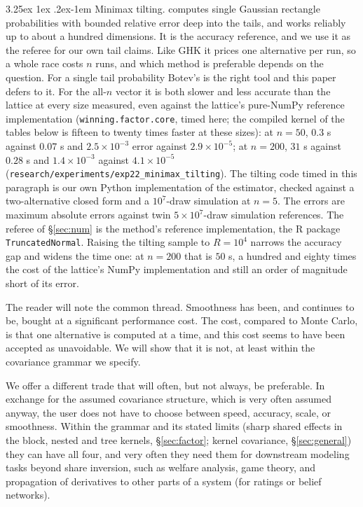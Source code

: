 \documentclass[11pt]{article}
\makeatletter
\renewcommand\paragraph{\@startsection{paragraph}{4}{\z@}%
  {3.25ex \@plus1ex \@minus.2ex}{-1em}%
  {\normalfont\normalsize\itshape}}
\makeatother
\begin{document}
\paragraph{Minimax tilting.} \citet{botev2017} computes single Gaussian
rectangle probabilities with bounded relative error deep into the tails,
and works reliably up to about a hundred dimensions. It is the accuracy reference, and
we use it as the referee for our own tail claims. Like GHK it prices one
alternative per run, so a whole race costs $n$ runs, and which method is
preferable depends on the question. For a single tail probability Botev's
is the right tool and this paper defers to it. For the all-$n$ vector it
is both slower and less accurate than the lattice at every size measured,
even against the lattice's pure-NumPy reference implementation
(\texttt{winning.factor.core}, timed here; the compiled kernel of the
tables below is fifteen to twenty times faster at these sizes):
at $n=50$, $0.3$ s against $0.07$ s and $2.5\times10^{-3}$ error against
$2.9\times10^{-5}$; at $n=200$, $31$ s against $0.28$ s and
$1.4\times10^{-3}$ against $4.1\times10^{-5}$
(\texttt{research/experiments/exp22\_minimax\_tilting}). The tilting
code timed in this paragraph is our own Python implementation of the
estimator, checked against a two-alternative closed form and a
$10^{7}$-draw simulation at $n=5$. The errors are maximum absolute
errors against twin $5\times10^{7}$-draw simulation references. The
referee of \S\ref{sec:num} is the method's reference implementation, the
R package \texttt{TruncatedNormal}. Raising the
tilting sample to $R=10^{4}$ narrows the accuracy gap and widens the time
one: at $n=200$ that is $50$ s, a hundred and eighty times the cost of the lattice's NumPy
implementation and still an order of magnitude short of its error.

\medskip

The reader will note the common thread. Smoothness has been, and continues to be, bought at a significant performance cost. The cost, compared to Monte Carlo, is that one alternative is computed at a time, and this cost seems to have been accepted as unavoidable. We will show that it is not, at least within the covariance grammar we specify.

We offer a different trade that will often, but not always, be preferable. In exchange for the assumed covariance structure, which is very often assumed anyway, the user does not have to choose between
speed, accuracy, scale, or smoothness. Within the grammar and its stated limits (sharp shared effects in the block, nested and tree kernels, \S\ref{sec:factor}; kernel covariance, \S\ref{sec:general}) they can have all four, and very often they need them for downstream modeling tasks beyond share inversion, such as welfare analysis, game theory, and propagation of derivatives to other parts of a system (for ratings or belief networks).
\end{document}
